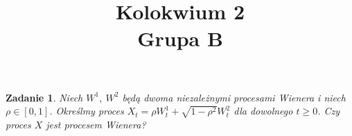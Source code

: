 \documentclass{mwart}
\title{Kolokwium 2\\Grupa B}
\newtheorem{zd}{Zadanie}
\begin{document}

\maketitle
\begin{zd}
Niech $W^1,\ W^2$ będą dwoma niezależnymi procesami Wienera i niech $\rho \in [0, 1]$. Określmy proces $X_t = \rho W_t^1 + \sqrt{1 - \rho^2}W^2_t$ dla dowolnego $t\geq 0$. Czy proces $X$ jest procesem Wienera?
\end{zd}
\end{document}
